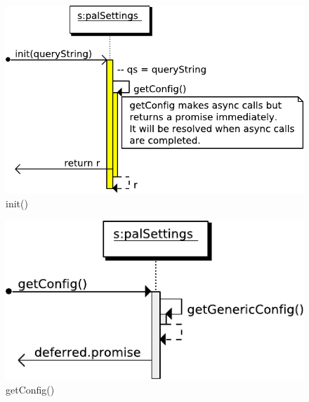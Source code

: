 \begin{figure}[htb]
    \centering
    \includegraphics{figures/design/seqdia/palSettings-init.pdf}
    \caption{init()}
    \label{fig:design-seqdia-palSettings-init}
\end{figure}


\begin{figure}[htb]
    \centering
    \includegraphics{figures/design/seqdia/palSettings-getConfig.pdf}
    \caption{getConfig()}
    \label{fig:design-seqdia-palSettings-getConfig}
\end{figure}

